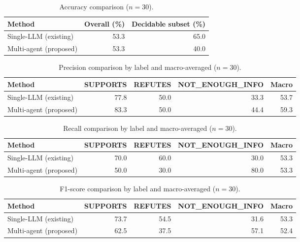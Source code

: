 
\begin{table}[H]
\centering
\caption{Accuracy comparison ($n = 30$).}
\label{tab:acc}
\small
\begin{tabular}{@{}lrr@{}}
\toprule
Method & Overall (\%) & Decidable subset (\%) \\
\midrule
Single-LLM (existing) & 53.3 & 65.0 \\
Multi-agent (proposed) & 53.3 & 40.0 \\
\bottomrule
\end{tabular}
\end{table}

\begin{table}[H]
\centering
\caption{Precision comparison by label and macro-averaged ($n = 30$).}
\label{tab:precision}
\small
\begin{tabular}{@{}lrrrr@{}}
\toprule
Method & SUPPORTS & REFUTES & NOT\_ENOUGH\_INFO & Macro \\
\midrule
Single-LLM (existing) & 77.8 & 50.0 & 33.3 & 53.7 \\
Multi-agent (proposed) & 83.3 & 50.0 & 44.4 & 59.3 \\
\bottomrule
\end{tabular}
\end{table}

\begin{table}[H]
\centering
\caption{Recall comparison by label and macro-averaged ($n = 30$).}
\label{tab:recall}
\small
\begin{tabular}{@{}lrrrr@{}}
\toprule
Method & SUPPORTS & REFUTES & NOT\_ENOUGH\_INFO & Macro \\
\midrule
Single-LLM (existing) & 70.0 & 60.0 & 30.0 & 53.3 \\
Multi-agent (proposed) & 50.0 & 30.0 & 80.0 & 53.3 \\
\bottomrule
\end{tabular}
\end{table}

\begin{table}[H]
\centering
\caption{F1-score comparison by label and macro-averaged ($n = 30$).}
\label{tab:f1}
\small
\begin{tabular}{@{}lrrrr@{}}
\toprule
Method & SUPPORTS & REFUTES & NOT\_ENOUGH\_INFO & Macro \\
\midrule
Single-LLM (existing) & 73.7 & 54.5 & 31.6 & 53.3 \\
Multi-agent (proposed) & 62.5 & 37.5 & 57.1 & 52.4 \\
\bottomrule
\end{tabular}
\end{table}

